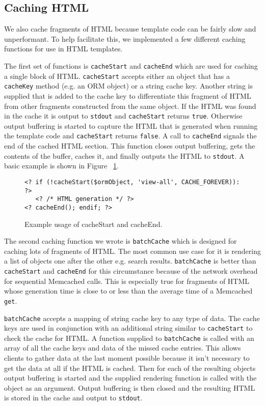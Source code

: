 \documentclass[12pt]{ucthesis}
\begin{document}
\subsection{Caching HTML}
We also cache fragments of HTML because template code can be fairly slow and unperformant.
To help facilitate this, we implemented a few different caching functions for use in HTML templates.

The first set of functions is {\tt cacheStart} and {\tt cacheEnd} which are used for caching a single block of HTML.
{\tt cacheStart} accepts either an object that has a {\tt cacheKey} method (e.g. an ORM object) or a string cache key.
Another string is supplied that is added to the cache key to differentiate this fragment of HTML from other fragments constructed from the same object.
If the HTML was found in the cache it is output to {\tt stdout} and {\tt cacheStart} returns {\tt true}.
Otherwise output buffering is started to capture the HTML that is generated when running the template code and {\tt cacheStart} returns {\tt false}.
A call to {\tt cacheEnd} signals the end of the cached HTML section.
This function closes output buffering, gets the contents of the buffer, caches it, and finally outputs the HTML to {\tt stdout}.
A basic example is shown in Figure ~\ref{fig:cacheStartExample}.

\begin{figure}[h]
\begin{verbatim}
<? if (!cacheStart($ormObject, 'view-all', CACHE_FOREVER)): ?>
   <? /* HTML generation */ ?>
<? cacheEnd(); endif; ?>
\end{verbatim}
\caption{Example usage of cacheStart and cacheEnd.}
\label{fig:cacheStartExample}
\end{figure}

The second caching function we wrote is {\tt batchCache} which is designed for caching lots of fragments of HTML.
The most common use case for it is rendering a list of objects one after the other e.g. search results.
{\tt batchCache} is better than {\tt cacheStart} and {\tt cacheEnd} for this circumstance because of the network overhead for sequential {\textsf Memcached} calls.
This is especially true for fragments of HTML whose generation time is close to or less than the average time of a {\textsf Memcached} {\tt get}.

{\tt batchCache} accepts a mapping of string cache key to any type of data.
The cache keys are used in conjunction with an additional string similar to {\tt cacheStart} to check the cache for HTML.
A function supplied to {\tt batchCache} is called with an array of all the cache keys and data of the missed cache entries.
This allows clients to gather data at the last moment possible because it isn't necessary to get the data at all if the HTML is cached.
Then for each of the resulting objects output buffering is started and the supplied rendering function is called with the object as an argument.
Output buffering is then closed and the resulting HTML is stored in the cache and output to {\tt stdout}.
\end{document}
